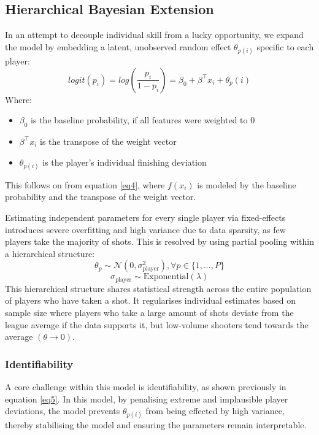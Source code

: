 \documentclass{article}
\begin{document}
\subsection{Hierarchical Bayesian Extension}
In an attempt to decouple individual skill from a lucky opportunity, we expand the model by embedding a latent, unobserved random effect $\theta_{p(i)}$ specific to each player:
\begin{equation}
    logit(p_i) = log(\frac{p_i}{1 - p_i}) = \beta_0 + \beta^\top x_i + \theta_p(i)
\end{equation}
Where:
\begin{itemize}
    \item $\beta_0$ is the baseline probability, if all features were weighted to 0
    \item $\beta^\top x_i$ is the transpose of the weight vector
    \item $\theta_{p(i)}$ is the player's individual finishing deviation
\end{itemize}
This follows on from equation \ref{eq4}, where $f(x_i)$ is modeled by the baseline probability and the transpose of the weight vector.

Estimating independent parameters for every single player via fixed-effects introduces severe overfitting and high variance due to data sparsity, as few players take the majority of shots. This is resolved by using partial pooling within a hierarchical structure:
\begin{equation}
    \theta_p \sim \mathcal{N}(0, \sigma_\text{player}^2), \forall p \in \{1, ..., P\}
\end{equation}
\begin{equation}
    \sigma_\text{player} \sim \text{Exponential}(\lambda)
\end{equation}
This hierarchical structure shares statistical strength across the entire population of players who have taken a shot. It regularises individual estimates based on sample size where players who take a large amount of shots deviate from the league average if the data supports it, but low-volume shooters tend towards the average $(\theta \to 0)$.

\subsubsection{Identifiability}
A core challenge within this model is identifiability, as shown previously in equation \ref{eq5}. In this model, by penalising extreme and implausible player deviations, the model prevents $\theta_{p(i)}$ from being effected by high variance, thereby stabilising the model and ensuring the parameters remain interpretable.
\end{document}

